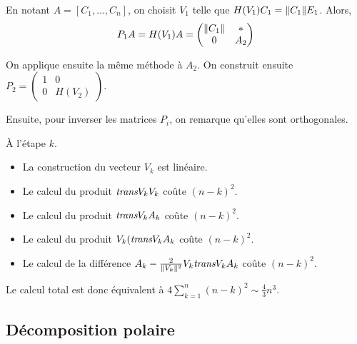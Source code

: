 En notant $A = [C_1,\ldots,C_n]$, on choisit $V_1$ telle que $H(V_1) C_1 = \Vert C_1 \Vert E_1$. Alors,
\[
P_1 A = H(V_1) A = \begin{pmatrix} \Vert C_1 \Vert & \ast \\ 0 & A_2 \end{pmatrix}
\]

On applique ensuite la même méthode à $A_2$. On construit ensuite $P_2 = \begin{pmatrix} 1 & 0 \\ 0 & H(V_2) \end{pmatrix}$.

Ensuite, pour inverser les matrices $P_i$, on remarque qu'elles sont orthogonales.

À l'étape $k$.
\begin{itemize}
\item La construction du vecteur $V_k$ est linéaire.
\item Le calcul du produit $\textit{trans}{V_k} V_k$ coûte $(n-k)^2$.
\item Le calcul du produit $\textit{trans}{V_k} A_k$ coûte $(n-k)^2$.
\item Le calcul du produit $V_k (\textit{trans}{V_k} A_k$ coûte $(n-k)^2$.
\item Le calcul de la différence $A_k - \frac{2}{\Vert V_k \Vert^2} V_k \textit{trans}{V_k} A_k$ coûte $(n-k)^2$.
\end{itemize}
Le calcul total est donc équivalent à $4 \sum\limits_{k=1}^n (n-k)^2 \sim \frac{4}{3} n^3$.

\subsection{Décomposition polaire}

